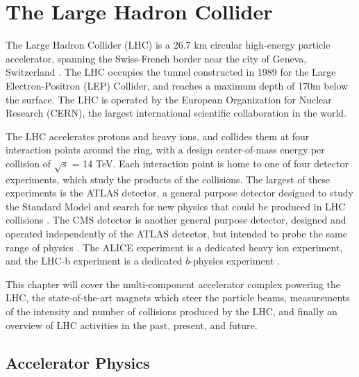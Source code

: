 \chapter{The Large Hadron Collider}
The Large Hadron Collider (LHC) is a 26.7 km circular high-energy particle accelerator, spanning the Swiss-French border near the city of Geneva, Switzerland \cite{LHC_machine}. The LHC occupies the tunnel constructed in 1989 for the Large Electron-Positron (LEP) Collider, and reaches a maximum depth of 170m below the surface. The LHC is operated by the European Organization for Nuclear Research (CERN), the largest international scientific collaboration in the world.\par

The LHC accelerates protons and heavy ions, and collides them at four interaction points around the ring, with a design center-of-mass energy per collision of $\sqrt{s}$ = 14 TeV. Each interaction point is home to one of four detector experiments, which study the products of the collisions. The largest of these experiments is the ATLAS detector, a general purpose detector designed to study the Standard Model and search for new physics that could be produced in LHC collisions \cite{ATLAS_at_LHC}. The CMS detector is another general purpose detector, designed and operated independently of the ATLAS detector, but intended to probe the same range of physics \cite{CMS_at_LHC}. The ALICE experiment is a dedicated heavy ion experiment, and the LHC-b experiment is a dedicated $b$-physics experiment  \cite{ALICE_at_LHC} \cite{LHCb_at_LHC}.\par

This chapter will cover the multi-component accelerator complex powering the LHC, the state-of-the-art magnets which steer the particle beams, measurements of the intensity and number of collisions produced by the LHC, and finally an overview of LHC activities in the past, present, and future.

 \section{Accelerator Physics}
